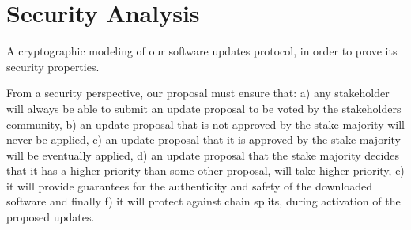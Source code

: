 \section{Security Analysis}
A cryptographic modeling of our software updates protocol, in order to prove its security properties. 

From a security perspective, our proposal must ensure that:
a) any stakeholder will always be able to submit an update proposal to be voted by the stakeholders community, b) an update proposal that is not approved by the stake majority will never be applied, c) an update proposal that it is approved by the stake majority will be eventually applied, d) an update proposal that the stake majority decides that it has a higher priority than some other proposal, will take higher priority, e) it will provide guarantees for the authenticity and safety of the downloaded software and finally f) it will protect against chain splits, during activation of the proposed updates.